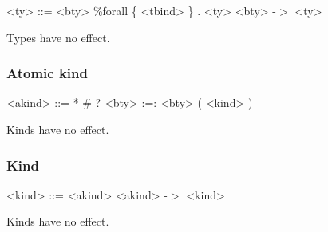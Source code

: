 \begin{grammar}
<ty> ::= <bty>
    \alt \%forall \{ <tbind> \} . <ty>
    \alt <bty> -$>$ <ty>
\end{grammar}

Types have no effect.

\subsubsection{Atomic kind}

\begin{grammar}
<akind> ::= *
       \alt \#
       \alt ?
       \alt <bty> :=: <bty>
       \alt ( <kind> )
\end{grammar}

Kinds have no effect.

\subsubsection{Kind}

\begin{grammar}
<kind> ::= <akind>
      \alt <akind> -$>$ <kind>
\end{grammar}

Kinds have no effect.


